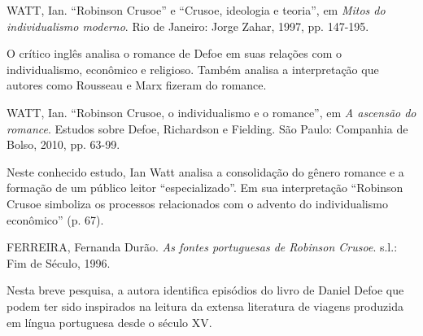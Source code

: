 \documentclass[12pt]{extarticle}
\begin{document}
WATT, Ian. ``Robinson Crusoe'' e ``Crusoe, ideologia e teoria'', em
\emph{Mitos do individualismo moderno}. Rio de Janeiro: Jorge Zahar,
1997, pp. 147-195.

O crítico inglês analisa o romance de Defoe em suas relações com o
individualismo, econômico e religioso. Também analisa a interpretação
que autores como Rousseau e Marx fizeram do romance.

WATT, Ian. ``Robinson Crusoe, o individualismo e o romance'', em \emph{A
ascensão do romance}. Estudos sobre Defoe, Richardson e Fielding. São
Paulo: Companhia de Bolso, 2010, pp. 63-99.

Neste conhecido estudo, Ian Watt analisa a consolidação do gênero
romance e a formação de um público leitor ``especializado''. Em sua
interpretação ``Robinson Crusoe simboliza os processos relacionados com
o advento do individualismo econômico'' (p. 67).

FERREIRA, Fernanda Durão. \emph{As fontes portuguesas de Robinson
Crusoe}. s.l.: Fim de Século, 1996.

Nesta breve pesquisa, a autora identifica episódios do livro de Daniel
Defoe que podem ter sido inspirados na leitura da extensa literatura de
viagens produzida em língua portuguesa desde o século XV.
\end{document}
